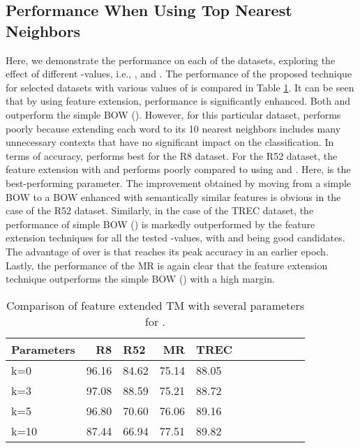 \documentclass[11pt]{article}
\begin{document}
\subsection{Performance When Using Top  Nearest Neighbors}
Here, we demonstrate the performance on each of the datasets, exploring the effect of different -values, i.e., ,  and . The performance of the proposed technique for selected datasets with various values of  is compared in Table \ref{table55}. It can be seen that by using feature extension, performance is significantly enhanced. Both  and  outperform the simple BOW (). However, for this particular dataset,  performs poorly because extending each word to its 10 nearest neighbors includes many unnecessary contexts that have no significant impact on the classification. In terms of accuracy,  performs best for the R8 dataset. For the R52 dataset, the feature extension with  and  performs poorly compared to using  and . Here,  is the best-performing parameter. The improvement obtained by moving from a simple BOW to a BOW enhanced with semantically similar features is obvious in the case of the R52 dataset. Similarly, in the case of the TREC dataset, the performance of simple BOW () is markedly outperformed by the feature extension techniques for all the tested -values, with  and  being good candidates. The advantage of  over  is that  reaches its peak accuracy  in an earlier epoch. Lastly, the performance of the MR is again clear that the feature extension technique outperforms the simple BOW () with a high margin.
\begin{table}
\centering
\begin{tabular}{lrlrlrlrlrl}
\hline \textbf{Parameters} & \textbf{R8} & \textbf{R52} & \textbf{MR} & \textbf{TREC} \\ \hline
k=0 & 96.16 & 84.62 & 75.14  & 88.05 \\
k=3 & 97.08 & 88.59 & 75.21  & 88.72 \\
k=5 & 96.80 & 70.60 & 76.06  & 89.16 \\
k=10 & 87.44 & 66.94 & 77.51  & 89.82 \\
\hline  
\end{tabular}
\caption{\label{table55} Comparison of feature extended TM with several parameters for .}
\end{table}
\end{document}
